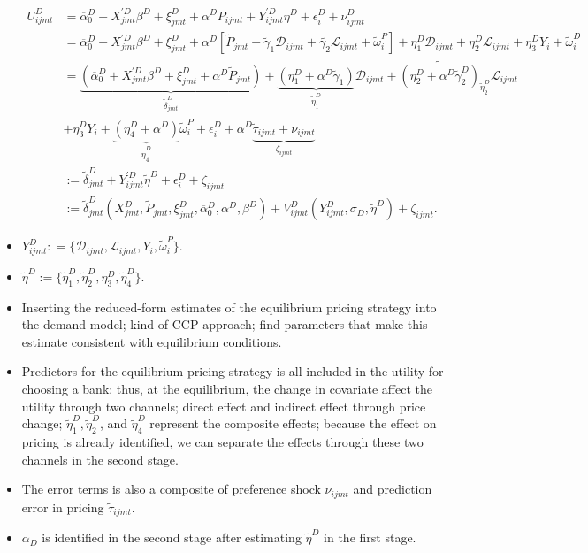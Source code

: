 \documentclass[]{book}
\begin{document}
\begin{itemize}
  \begin{equation}
  \begin{split}
  U_{ijmt}^D &= \overline{\alpha}_0^D + X_{jmt}^{\prime D} \beta^D + \xi_{jmt}^D + \alpha^D P_{ijmt} + Y_{ijmt}^{\prime D} \eta^D + \epsilon_i^D + \nu_{ijmt}^D\\
  &= \overline{\alpha}_0^D + X_{jmt}^{\prime D} \beta^D + \xi_{jmt}^D + \alpha^D[\tilde{P}_{jmt} + \tilde{\gamma}_1 \mathcal{D}_{ijmt} + \tilde{\gamma_2} \mathcal{L}_{ijmt} + \tilde{\omega}_i^P] + \eta_1^D \mathcal{D}_{ijmt} + \eta_2^D \mathcal{L}_{ijmt} + \eta_3^D Y_i + \tilde{\omega}_i^D\\
  &= \underbrace{(\overline{\alpha}_0^D + X_{jmt}^{\prime D} \beta^D + \xi_{jmt}^D + \alpha^D \tilde{P}_{jmt})}_{\tilde{\delta}_{jmt}^D} + \underbrace{(\eta_1^D + \alpha^D \tilde{\gamma}_1)}_{\tilde{\eta}_1^D}\mathcal{D}_{ijmt} + \tilde{(\eta_2^D + \alpha^D \tilde{\gamma}_2^D)}_{\tilde{\eta}_2^D} \mathcal{L}_{ijmt}\\
  &+ \eta_3^D Y_i + \underbrace{(\eta_4^D + \alpha^D)}_{\tilde{\eta}_4^D} \tilde{\omega}_i^P + \epsilon_i^D + \alpha^D \underbrace{\tilde{\tau}_{ijmt} + \nu_{ijmt}}_{\zeta_{ijmt}}\\
  &:= \tilde{\delta}_{jmt}^D + Y_{ijmt}^{\prime D} \tilde{\eta}^D + \epsilon_i^D + \zeta_{ijmt}\\
  &:= \tilde{\delta}_{jmt}^D(X_{jmt}^D, \widetilde{P}_{jmt}, \xi_{jmt}^D, \overline{\alpha}_0^D, \alpha^D, \beta^D) + V_{ijmt}^D(Y_{ijmt}^D, \sigma_D, \tilde{\eta}^D) + \zeta_{ijmt}.
  \end{split}
  \end{equation}
\item
  \(Y_{ijmt}^D : = \{\mathcal{D}_{ijmt}, \mathcal{L}_{ijmt}, Y_i, \tilde{\omega}_i^P\}\).
\item
  \(\tilde{\eta}^D := \{\tilde{\eta}_1^D, \tilde{\eta}_2^D, \eta_3^D, \tilde{\eta}_4^D\}\).
\item
  Inserting the reduced-form estimates of the equilibrium pricing
  strategy into the demand model; kind of CCP approach; find parameters
  that make this estimate consistent with equilibrium conditions.
\item
  Predictors for the equilibrium pricing strategy is all included in the
  utility for choosing a bank; thus, at the equilibrium, the change in
  covariate affect the utility through two channels; direct effect and
  indirect effect through price change;
  \(\tilde{\eta}_1^D, \tilde{\eta}_2^D\), and \(\tilde{\eta}_4^D\)
  represent the composite effects; because the effect on pricing is
  already identified, we can separate the effects through these two
  channels in the second stage.
\item
  The error terms is also a composite of preference shock \(\nu_{ijmt}\)
  and prediction error in pricing \(\tilde{\tau}_{ijmt}\).
\item
  \(\alpha_D\) is identified in the second stage after estimating
  \(\tilde{\eta}^D\) in the first stage.
\end{itemize}
\end{document}
